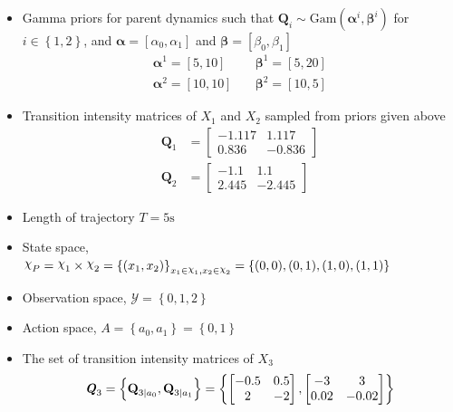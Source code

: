 \begin{itemize}
	\item Gamma priors for parent dynamics such that $ \textbf{Q}_{i} \sim \mathrm{Gam}(\symbf{\alpha}^i, \symbf{\beta}^i)$ for $i \in \left\lbrace 1,2\right\rbrace $, and $ \symbf{\alpha} = [\alpha_0, \alpha_1] $ and $ \symbf{\beta} = [\beta_0, \beta_1] $
	\begin{align}
	\symbf{\alpha}^1 = [5,10] &\quad \symbf{\beta}^1 = [5,20] \\
	\symbf{\alpha}^2 = [10,10] &\quad \symbf{\beta}^2 = [10,5]
	\label{eq:gamma_params}
	\end{align}
	\item Transition intensity matrices of $ X_1 $ and $ X_2 $ sampled from priors given above
	\begin{align}
	\textbf{Q}_1 &= 
	\begin{bmatrix}
	-1.117 & 1.117 \\
	0.836 &  -0.836
	\end{bmatrix} \\
	\textbf{Q}_2 &= 
	\begin{bmatrix}
	-1.1 & 1.1 \\
	2.445 &  -2.445
	\end{bmatrix}
	\end{align}
	\item Length of trajectory $ T = 5\text{s} $
	\item State space, $ \rchi_{P} = \rchi_1 \times \rchi_2 = \left\lbrace (x_1, x_2)\right\rbrace_{x_1\in \rchi_1, x_2\in \rchi_2} = \left\lbrace (0, 0), (0, 1), (1, 0),(1, 1)\right\rbrace $
	\item Observation space, $ \mathcal{Y} = \left\lbrace 0, 1, 2 \right\rbrace $
	\item Action space, $ \textit{A} = \left\lbrace a_{0}, a_{1} \right\rbrace = \left\lbrace 0, 1\right\rbrace $
	\item The set of transition intensity matrices of $ X_3 $
	\begin{align}
	\textbf{\textit{Q}}_3 = \left\lbrace \textbf{Q}_{3\mid a_{0}}, \textbf{Q}_{3\mid a_{1}} \right\rbrace = \left\lbrace 
	\begin{bmatrix}
	-0.5 & 0.5 \\
	2 &  -2
	\end{bmatrix}, 
	\begin{bmatrix}
	-3 & 3 \\
	0.02 &  -0.02
	\end{bmatrix} 
	\right\rbrace 
	\end{align}

\end{itemize}

